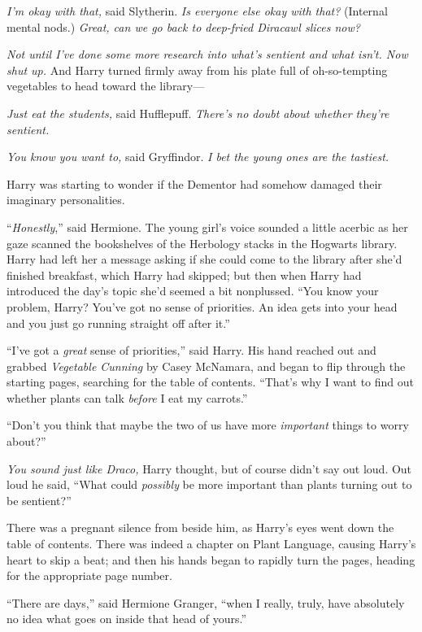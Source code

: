 \emph{I’m okay with that,} said Slytherin. \emph{Is everyone else okay with that?} (Internal mental nods.) \emph{Great, can we go back to deep-fried Diracawl slices now?}

\emph{Not until I’ve done some more research into what’s sentient and what isn’t. Now shut up.} And Harry turned firmly away from his plate full of oh-so-tempting vegetables to head toward the library—

\emph{Just eat the students,} said Hufflepuff. \emph{There’s no doubt about whether \emph{they’re} sentient.}

\emph{You know you want to,} said Gryffindor. \emph{I bet the young ones are the tastiest.}

Harry was starting to wonder if the Dementor had somehow damaged their imaginary personalities.

\later

“\emph{Honestly},” said Hermione. The young girl’s voice sounded a little acerbic as her gaze scanned the bookshelves of the Herbology stacks in the Hogwarts library. Harry had left her a message asking if she could come to the library after she’d finished breakfast, which Harry had skipped; but then when Harry had introduced the day’s topic she’d seemed a bit nonplussed. “You know your problem, Harry? You’ve got no sense of priorities. An idea gets into your head and you just go running straight off after it.”

“I’ve got a \emph{great} sense of priorities,” said Harry. His hand reached out and grabbed \emph{Vegetable Cunning} by Casey McNamara, and began to flip through the starting pages, searching for the table of contents. “That’s why I want to find out whether plants can talk \emph{before} I eat my carrots.”

“Don’t you think that maybe the two of us have more \emph{important} things to worry about?”

\emph{You sound just like Draco,} Harry thought, but of course didn’t say out loud. Out loud he said, “What could \emph{possibly} be more important than plants turning out to be sentient?”

There was a pregnant silence from beside him, as Harry’s eyes went down the table of contents. There was indeed a chapter on Plant Language, causing Harry’s heart to skip a beat; and then his hands began to rapidly turn the pages, heading for the appropriate page number.

“There are days,” said Hermione Granger, “when I really, truly, have absolutely no idea what goes on inside that head of yours.”

